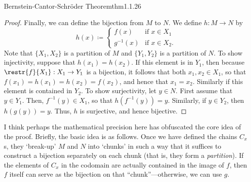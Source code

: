 \begin{thm}{Bernstein-Cantor-Schr\"{o}der Theorem}{thm1.1.26}
\begin{proof}
Finally, we can define the bijection from $M$ to $N$.  We define $h \colon M\rightarrow N$ by
\begin{equation}
h(x)\coloneqq \begin{cases}f(x) & \text{if }x\in X_1 \\ g^{-1}(x) & \text{if }x\in X_2.\end{cases}
\end{equation}
Note that $\{ X_1,X_2\}$ is a partition of $M$ and $\{ Y_1,Y_2\}$ is a partition of $N$.  To show injectivity, suppose that $h(x_1)=h(x_2)$.  If this element is in $Y_1$, then because $\restr{f}{X_1}:X_1\rightarrow Y_1$ is a bijection, it follows that both $x_1,x_2\in X_1$, so that $f(x_1)=h(x_1)=h(x_2)=f(x_2)$, and hence that $x_1=x_2$.  Similarly if this element is contained in $Y_2$.  To show surjectivity, let $y\in N$.  First assume that $y\in Y_1$.  Then, $f^{-1}(y)\in X_1$, so that $h\left( f^{-1}(y)\right) =y$.  Similarly, if $y\in Y_2$, then $h\left( g(y)\right) =y$.  Thus, $h$ is surjective, and hence bijective.
\end{proof}
\begin{rmk}
I think perhaps the mathematical precision here has obfuscated the core idea of the proof.  Briefly, the basic idea is as follows.  Once we have defined the chains $C_x$s, they `break-up' $M$ and $N$ into `chunks' in such a way that it suffices to construct a bijection separately on each chunk (that is, they form a \emph{partition}).  If the elements of $C_x$ in the codomain are actually contained in the image of $f$, then $f$ itself can serve as the bijection on that ``chunk''---otherwise, we can use $g$.
\end{rmk}
\end{thm}

